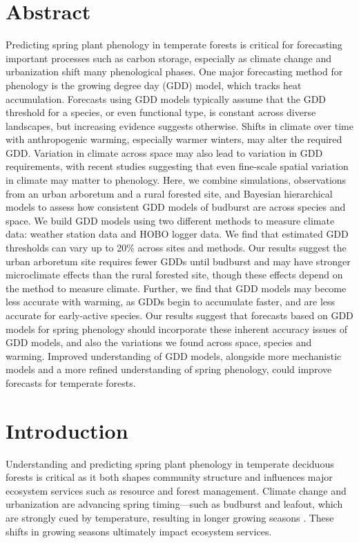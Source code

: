 \documentclass{article}\usepackage[]{graphicx}\usepackage[]{color}
\begin{document}
\section*{Abstract} 
Predicting spring plant phenology in temperate forests is critical for forecasting important processes such as carbon storage, especially as climate change and urbanization shift many phenological phases. One major forecasting method for phenology is the growing degree day (GDD) model, which tracks heat accumulation. Forecasts using GDD models typically assume that the GDD threshold for a species, or even functional type, is constant across diverse landscapes, but increasing evidence suggests otherwise. Shifts in climate over time with anthropogenic warming, especially warmer winters, may alter the required GDD. Variation in climate across space may also lead to variation in GDD requirements, with recent studies suggesting that even fine-scale spatial variation in climate may matter to phenology. Here, we combine simulations, observations from an urban arboretum and a rural forested site, and Bayesian hierarchical models to assess how consistent GDD models of budburst are across species and space. We build GDD models using two different methods to measure climate data: weather station data and HOBO logger data. We find that estimated GDD thresholds can vary up to 20\% across sites and methods. Our results suggest the urban arboretum site requires fewer GDDs until budburst and may have stronger microclimate effects than the rural forested site, though these effects depend on the method to measure climate. Further, we find that GDD models may become less accurate with warming, as GDDs begin to accumulate faster, and are less accurate for early-active species. Our results suggest that forecasts based on GDD models for spring phenology should incorporate these inherent accuracy issues of GDD models, and also the variations we found across space, species and warming. Improved understanding of GDD models, alongside more mechanistic models and a more refined understanding of spring phenology, could improve forecasts for temperate forests.  

\section*{Introduction}

Understanding and predicting spring plant phenology in temperate deciduous forests is critical as it both shapes community structure and influences major ecosystem services such as resource and forest management. Climate change and urbanization are advancing spring timing---such as budburst and leafout, which are strongly cued by temperature, resulting in longer growing seasons \citep{Chuine2001}. These shifts in growing seasons ultimately impact ecosystem services. 
 
\end{document}

